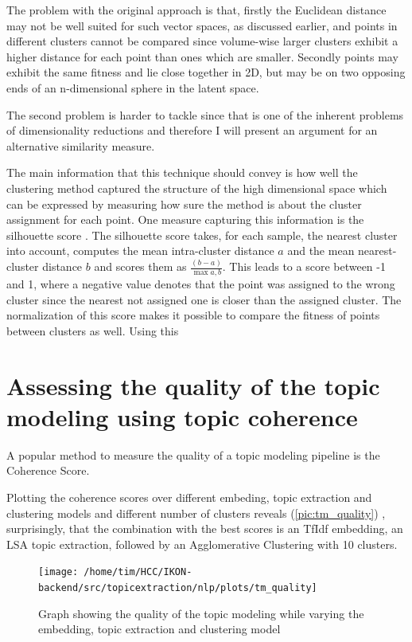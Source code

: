 The problem with the original approach is that, firstly the Euclidean distance may not be well suited for such vector spaces, as discussed earlier, and points in different clusters cannot be compared since volume-wise larger clusters exhibit a higher distance for each point than ones which are smaller. Secondly points may exhibit the same fitness and lie close together in 2D, but may be on two opposing ends of an n-dimensional sphere in the latent space. 

The second problem is harder to tackle since that is one of the inherent problems of dimensionality reductions and therefore I will present an argument for an alternative similarity measure.

The main information that this technique should convey is how well the clustering method captured the structure of the high dimensional space which can be expressed by measuring how sure the method is about the cluster assignment for each point. One measure capturing this information is the silhouette score \cite{rousseeuwSilhouettesGraphicalAid1987}. The silhouette score takes, for each sample, the nearest cluster into account, computes the mean intra-cluster distance $a$ and the mean nearest-cluster distance $b$ and scores them as $\frac{(b-a)}{\max{a,b}}$. This leads to a score between -1 and 1, where a negative value denotes that the point was assigned to the wrong cluster since the nearest not assigned one is closer than the assigned cluster. The normalization of this score makes it possible to compare the fitness of points between clusters as well.
Using this 


\section{Assessing the quality of the topic modeling using topic coherence}

A popular method to measure the quality of a topic modeling pipeline is the Coherence Score. 

Plotting the coherence scores over different embeding, topic extraction and clustering models and different number of clusters reveals (\autoref{pic:tm_quality}) , surprisingly, that the combination with the best scores is an TfIdf embedding, an LSA topic extraction, followed by an Agglomerative Clustering with 10 clusters.

\begin{figure}[t]
	\centering
	\texttt{[image: /home/tim/HCC/IKON-backend/src/topicextraction/nlp/plots/tm\_quality]}
	\caption{\label{pic:tm_quality} Graph showing the quality of the topic modeling while varying the embedding, topic extraction and clustering model}
\end{figure}

